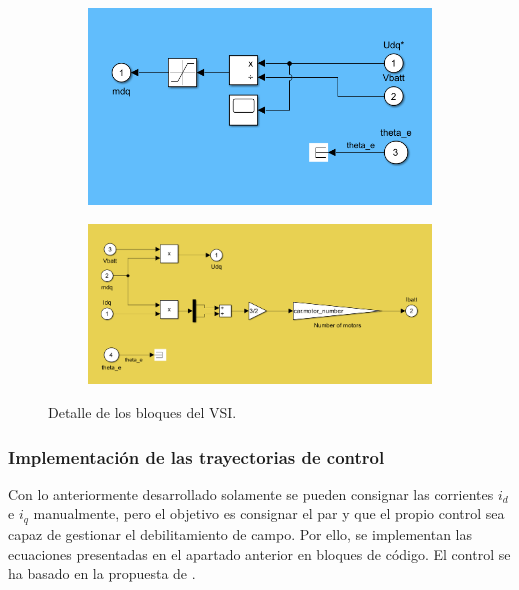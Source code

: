 \begin{figure}[H]
    \centering
    \begin{subfigure}{0.45\linewidth}
        \centering
        \includegraphics[width=\linewidth]{fig/VSIEMR_in1.png}
    \end{subfigure}
    \begin{subfigure}{0.45\linewidth}
        \centering
        \includegraphics[width=\linewidth]{fig/VSIEMR_in2.png}
    \end{subfigure}
    \caption{Detalle de los bloques del VSI.}

\end{figure}

\subsubsection{Implementación de las trayectorias de control}

Con lo anteriormente desarrollado solamente se pueden consignar las corrientes $i_d$ e $i_q$ manualmente, pero el objetivo es consignar el par y que el propio control sea capaz de gestionar el debilitamiento de campo. Por ello, se implementan las ecuaciones presentadas en el apartado anterior en bloques de código. El control se ha basado en la propuesta de \cite{carlos2023}.

